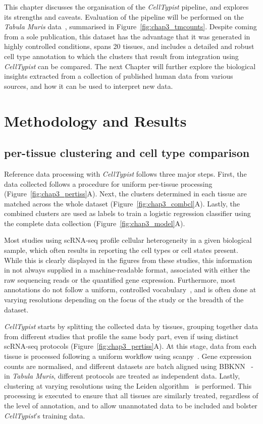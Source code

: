 This chapter discusses the organisation of the \textit{CellTypist} pipeline, and explores its strengths and caveats. Evaluation of the pipeline will be performed on the \textit{Tabula Muris} data~\citep{noauthor_single-cell_2018}, summarised in Figure~\ref{fig:chap3_tmcounts}. Despite coming from a sole publication, this dataset has the advantage that it was generated in highly controlled conditions, spans 20 tissues, and includes a detailed and robust cell type annotation to which the clusters that result from integration using \textit{CellTypist} can be compared. The next Chapter will further explore the biological insights extracted from a collection of published human data from various sources, and how it can be used to interpret new data.



\section{Methodology and Results}
\label{section3.2}
\subsection{per-tissue clustering and cell type comparison}
\label{section3.2.1}
Reference data processing with \textit{CellTypist} follows three major steps. First, the data collected follows a procedure for uniform per-tissue processing (Figure~\ref{fig:chap3_pertiss}A). Next, the clusters determined in each tissue are matched across the whole dataset (Figure~\ref{fig:chap3_combcl}A). Lastly, the combined clusters are used as labels to train a logistic regression classifier using the complete data collection (Figure~\ref{fig:chap3_model}A).

Most studies using scRNA-seq profile cellular heterogeneity in a given biological sample, which often results in reporting the cell types or cell states present. While this is clearly displayed in the figures from these studies, this information in not always supplied in a machine-readable format, associated with either the raw sequencing reads or the quantified gene expression. Furthermore, most annotations do not follow a uniform, controlled vocabulary~\citep{bard_ontology_2005}, and is often done at varying resolutions depending on the focus of the study or the breadth of the dataset.

\textit{CellTypist} starts by splitting the collected data by tissues, grouping together data from different studies that profile the same body part, even if using distinct scRNA-seq protocols (Figure~\ref{fig:chap3_pertiss}A). At this stage, data from each tissue is processed following a uniform workflow using scanpy~\citep{wolf_scanpy:_2018}. Gene expression counts are normalised, and different datasets are batch aligned using BBKNN~\citep{polanski_bbknn:_2019} - in \textit{Tabula Muris}, different protocols are treated as independent data. Lastly, clustering at varying resolutions using the Leiden algorithm~\citep{traag_louvain_2019} is performed. This processing is executed to ensure that all tissues are similarly treated, regardless of the level of annotation, and to allow unannotated data to be included and bolster \textit{CellTypist}'s training data.

